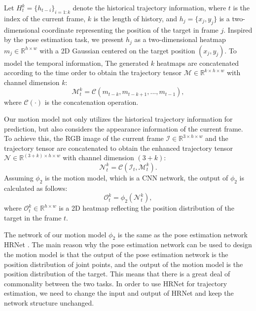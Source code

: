 Let $H_{t}^{k} = \{h_{t-i}\}_{i=1:k}$ denote the historical trajectory information, where $t$ is the index of the current frame, $k$ is the length of history, and $h_{j} = \{x_{j}, y_{j}\}$ is a two-dimensional coordinate representing the position of the target in frame $j$.
Inspired by the pose estimation task, we present $h_{j}$ as a two-dimensional heatmap $m_{j} \in \mathbb R^{h \times w}$ with a 2D Gaussian centered on the target position $(x_{j}, y_{j})$.
To model the temporal information,  The generated $k$ heatmaps are concatenated according to the time order to obtain the trajectory tensor $\mathcal{M} \in \mathbb{R}^{k \times h \times w}$ with channel dimension $k$: 
\begin{equation}
    \mathcal{M}_{t}^{k} = \mathcal{C}(m_{t-k}, m_{t-k+1}, ..., m_{t-1}),
\end{equation}
where $\mathcal{C}(\cdot)$ is the concatenation operation.

Our motion model not only utilizes the historical trajectory information for prediction, but also considers the appearance information of the current frame.
To achieve this, the RGB image of the current frame $\mathcal{I} \in \mathbb{R}^{3 \times h \times w}$ and the trajectory tensor are concatenated to obtain the enhanced trajectory tensor $\mathcal{N} \in \mathbb{R}^{(3+k) \times h \times w}$ with channel dimension $(3+k)$:
\begin{equation}
    \mathcal{N}_{t}^{k} = \mathcal{C}(\mathcal{I}_{t}, \mathcal{M}_{t}^{k}).
\end{equation}
Assuming $\phi_{2}$ is the motion model, which is a CNN network, the output of $\phi_{2}$ is calculated as follows:
\begin{equation}
    \mathcal{O}_{t}^{k} = \phi_{2}(\mathcal{N}_{t}^{k}),
\end{equation}
where $\mathcal{O}_{t}^{k} \in \mathbb{R}^{h \times w}$ is a 2D heatmap reflecting the position distribution of the target in the frame $t$.

The network of our motion model $\phi_{2}$ is the same as the pose estimation network HRNet \cite{sun2019deep}. 
\iffalse
The main reason why the pose estimation network can be used to design the motion model is that the output of the pose estimation network is the position distribution of joint points, and the output of the motion model is the position distribution of the target. This means that there is a great deal of commonality between the two tasks. In order to use HRNet for trajectory estimation, we need to change the input and output of HRNet and keep the network structure unchanged.

